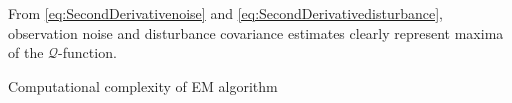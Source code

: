 \documentclass[]{article}
\begin{document}
From \eqref{eq:SecondDerivativenoise} and \eqref{eq:SecondDerivativedisturbance}, observation noise and disturbance covariance estimates clearly represent maxima of the $\mathcal{Q}$-function. 
 \begin {table}
\begin{center}
 \caption {Computational complexity of EM algorithm} 
\label{table:ComputationalComplexity}
\end{center}
\end {table}
\end{document}
